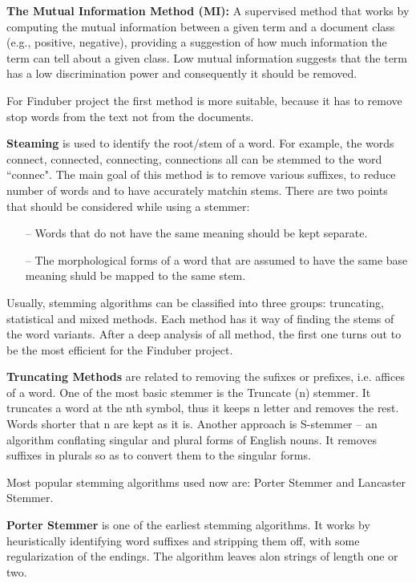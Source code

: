 \textbf{The Mutual Information Method (MI):} A supervised method that works by computing the mutual information between a given term and a document class (e.g., positive, negative), providing a suggestion of how much information the term can tell about a given class. Low mutual information suggests that the term has a low discrimination power and consequently it should be removed.\cite{MI}

For Finduber project the first method is more suitable, because it has to remove stop words from the text not from the documents.

\textbf{Steaming} is used to identify the root/stem of a word. For example, the words connect, connected, connecting, connections all can be stemmed to the word ``connec". \cite{stemming} The main goal of this method is to remove various suffixes, to reduce number of words and to have accurately matchin stems. There are two points that should be considered while using a stemmer:

\begin{itemize}
\item[--] Words that do not have the same meaning should be kept separate.
\item[--] The morphological forms of a word that are assumed to have the same base meaning shuld be mapped to the same stem. 
\end{itemize}

Usually, stemming algorithms can be classified into three groups: truncating, statistical and mixed methods. Each method has it way of finding the stems of the word variants. After a deep analysis of all method, the first one turns out to be the most efficient for the Finduber project. 

\textbf{Truncating Methods} are related to removing the sufixes or prefixes, i.e. affices of a word. One of the most basic stemmer is the Truncate (n) stemmer. It truncates a word at the nth symbol, thus it keeps n letter and removes the rest. Words shorter that n are kept as it is. Another approach is S-stemmer -- an algorithm conflating singular and plural forms of English nouns. It removes suffixes in plurals so as to convert them to the singular forms. \cite{truncat-stemm}

Most popular stemming algorithms used now are: Porter Stemmer and Lancaster Stemmer.

\textbf{Porter Stemmer} is one of the earliest stemming algorithms. It works by heuristically identifying word suffixes and stripping them off, with some regularization of the endings. The algorithm leaves alon strings of length one or two. 

